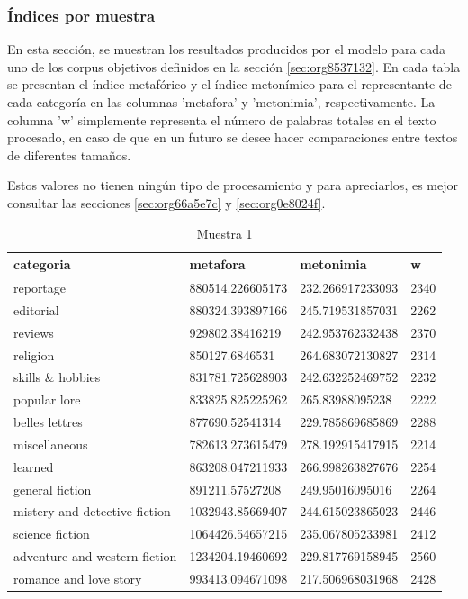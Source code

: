 \documentclass[12pt,letterpaper,twoside]{article}
\begin{document}
\subsubsection{Índices por muestra}
\label{sec:org390998b}
En esta sección, se muestran los resultados producidos por el modelo
para cada uno de los corpus objetivos definidos en la sección
\ref{sec:org8537132}. En cada tabla se presentan el índice
metafórico y el índice metonímico para el representante de cada
categoría en las columnas 'metafora' y 'metonimia',
respectivamente. La columna 'w' simplemente representa el número de
palabras totales en el texto procesado, en caso de que en un futuro se
desee hacer comparaciones entre textos de diferentes tamaños.

Estos valores no tienen ningún tipo de procesamiento y para apreciarlos, es mejor
consultar las secciones \ref{sec:org66a5e7c} y \ref{sec:org0e8024f}.

\small
\begin{center}
    \begin{longtable}{| p{} | p{} | p{}|p{}|}
    \caption{Muestra 1}
    \hline
        categoria & metafora & metonimia & w \\ \hline
        reportage & 880514.226605173 & 232.266917233093 & 2340 \\ \hline
        editorial & 880324.393897166 & 245.719531857031 & 2262 \\ \hline
        reviews & 929802.38416219 & 242.953762332438 & 2370 \\ \hline
        religion & 850127.6846531 & 264.683072130827 & 2314 \\ \hline
        skills \& hobbies & 831781.725628903 & 242.632252469752 & 2232 \\ \hline
        popular lore & 833825.825225262 & 265.83988095238 & 2222 \\ \hline
        belles lettres & 877690.52541314 & 229.785869685869 & 2288 \\ \hline
        miscellaneous & 782613.273615479 & 278.192915417915 & 2214 \\ \hline
        learned & 863208.047211933 & 266.998263827676 & 2254 \\ \hline
        general fiction & 891211.57527208 & 249.95016095016 & 2264 \\ \hline
        mistery and detective fiction & 1032943.85669407 & 244.615023865023 & 2446 \\ \hline
        science fiction & 1064426.54657215 & 235.067805233981 & 2412 \\ \hline
        adventure and western fiction & 1234204.19460692 & 229.817769158945 & 2560 \\ \hline
        romance and love story & 993413.094671098 & 217.506968031968 & 2428 \\ \hline
\end{longtable}
\label{muestra1}
\end{center}
\end{document}
